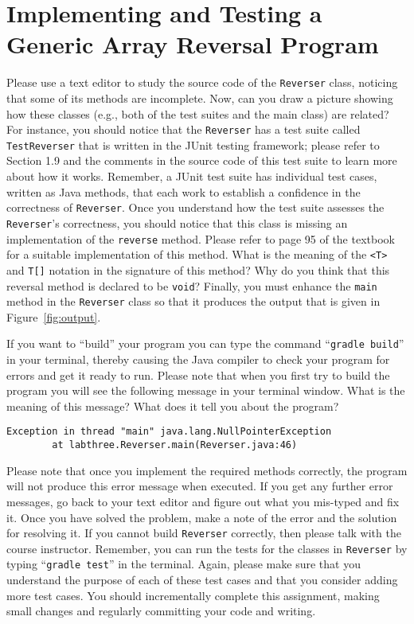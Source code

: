 \documentclass[11pt]{article}
\newcommand{\mainprogram}{\lstinline{Reverser}}
\newcommand{\testprogram}{\lstinline{TestReverser}}
\newcommand{\gradlebuild}{\command{gradle build}}
\newcommand{\gradletest}{\command{gradle test}}
\newcommand{\command}[1]{``\lstinline{#1}''}
\newcommand{\program}[1]{\lstinline{#1}}
\newcommand{\step}[1]{``{#1}''}
\begin{document}
\section*{Implementing and Testing a Generic Array Reversal Program}


Please use a text editor to study the source code of the \mainprogram{} class,
noticing that some of its methods are incomplete. Now, can you draw a picture
showing how these classes (e.g., both of the test suites and the main class) are
related? For instance, you should notice that the \mainprogram{} has a test
suite called \testprogram{} that is written in the JUnit testing framework;
please refer to Section 1.9 and the comments in the source code of this test
suite to learn more about how it works. Remember, a JUnit test suite has
individual test cases, written as Java methods, that each work to establish a
confidence in the correctness of \mainprogram{}. Once you understand how the
test suite assesses the \mainprogram's correctness, you should notice that this
class is missing an implementation of the \program{reverse} method. Please refer
to page 95 of the textbook for a suitable implementation of this method. What is
the meaning of the \program{<T>} and \program{T[]} notation in the signature of
this method? Why do you think that this reversal method is declared to be
\program{void}? Finally, you must enhance the \program{main} method in the
\mainprogram{} class so that it produces the output that is given in
Figure~\ref{fig:output}.

If you want to \step{build} your program you can type the command \gradlebuild{}
in your terminal, thereby causing the Java compiler to check your program for
errors and get it ready to run. Please note that when you first try to build the
program you will see the following message in your terminal window. What is the
meaning of this message? What does it tell you about the program?

\vspace*{-.075in}
\begin{verbatim}
Exception in thread "main" java.lang.NullPointerException
        at labthree.Reverser.main(Reverser.java:46)
\end{verbatim}
\vspace*{-.075in}

Please note that once you implement the required methods correctly, the program
will not produce this error message when executed. If you get any further error
messages, go back to your text editor and figure out what you mis-typed and fix
it. Once you have solved the problem, make a note of the error and the solution
for resolving it. If you cannot build \mainprogram{} correctly, then please talk
with the course instructor. Remember, you can run the tests for the classes in
\mainprogram{} by typing \gradletest{} in the terminal. Again, please make sure
that you understand the purpose of each of these test cases and that you
consider adding more test cases. You should incrementally complete this
assignment, making small changes and regularly committing your code and writing.
\end{document}
